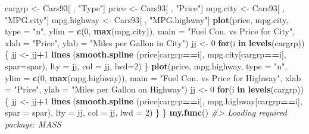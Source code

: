 \documentclass[
]{book}
\newenvironment{Shaded}{\begin{snugshade}}{\end{snugshade}}
\newcommand{\AttributeTok}[1]{\textcolor[rgb]{0.13,0.29,0.53}{#1}}
\newcommand{\CommentTok}[1]{\textcolor[rgb]{0.56,0.35,0.01}{\textit{#1}}}
\newcommand{\ControlFlowTok}[1]{\textcolor[rgb]{0.13,0.29,0.53}{\textbf{#1}}}
\newcommand{\DecValTok}[1]{\textcolor[rgb]{0.00,0.00,0.81}{#1}}
\newcommand{\FunctionTok}[1]{\textcolor[rgb]{0.13,0.29,0.53}{\textbf{#1}}}
\newcommand{\NormalTok}[1]{#1}
\newcommand{\OtherTok}[1]{\textcolor[rgb]{0.56,0.35,0.01}{#1}}
\newcommand{\SpecialCharTok}[1]{\textcolor[rgb]{0.81,0.36,0.00}{\textbf{#1}}}
\newcommand{\StringTok}[1]{\textcolor[rgb]{0.31,0.60,0.02}{#1}}
\begin{document}
\begin{Shaded}
\begin{Highlighting}[]
\NormalTok{  cargrp }\OtherTok{\textless{}{-}}\NormalTok{ Cars93[ , }\StringTok{"Type"}\NormalTok{]}
\NormalTok{  price }\OtherTok{\textless{}{-}}\NormalTok{ Cars93[ , }\StringTok{"Price"}\NormalTok{]}
\NormalTok{  mpg.city }\OtherTok{\textless{}{-}}\NormalTok{ Cars93[ , }\StringTok{"MPG.city"}\NormalTok{]}
\NormalTok{  mpg.highway }\OtherTok{\textless{}{-}}\NormalTok{ Cars93[ , }\StringTok{"MPG.highway"}\NormalTok{]}
  \FunctionTok{plot}\NormalTok{(price, mpg.city, }\AttributeTok{type =} \StringTok{"n"}\NormalTok{, }\AttributeTok{ylim =} \FunctionTok{c}\NormalTok{(}\DecValTok{0}\NormalTok{, }\FunctionTok{max}\NormalTok{(mpg.city)), }
       \AttributeTok{main =} \StringTok{"Fuel Con. vs Price for City"}\NormalTok{, }\AttributeTok{xlab =} \StringTok{"Price"}\NormalTok{, }
       \AttributeTok{ylab =} \StringTok{"Miles per Gallon in City"}\NormalTok{)}
\NormalTok{  jj }\OtherTok{\textless{}{-}} \DecValTok{0}
  \ControlFlowTok{for}\NormalTok{(i }\ControlFlowTok{in} \FunctionTok{levels}\NormalTok{(cargrp))}
\NormalTok{    \{  jj }\OtherTok{\textless{}{-}}\NormalTok{ jj}\SpecialCharTok{+}\DecValTok{1}
       \FunctionTok{lines}\NormalTok{ (}\FunctionTok{smooth.spline}\NormalTok{ (price[cargrp}\SpecialCharTok{==}\NormalTok{i], mpg.city[cargrp}\SpecialCharTok{==}\NormalTok{i], }\AttributeTok{spar=}\NormalTok{spar),}
              \AttributeTok{lty =}\NormalTok{ jj, }\AttributeTok{col =}\NormalTok{ jj, }\AttributeTok{lwd=}\DecValTok{2}\NormalTok{)}
\NormalTok{    \}}
  \FunctionTok{plot}\NormalTok{(price, mpg.highway, }\AttributeTok{type =} \StringTok{"n"}\NormalTok{, }\AttributeTok{ylim =} \FunctionTok{c}\NormalTok{(}\DecValTok{0}\NormalTok{, }\FunctionTok{max}\NormalTok{(mpg.highway)), }
       \AttributeTok{main =} \StringTok{"Fuel Con. vs Price for Highway"}\NormalTok{, }\AttributeTok{xlab =} \StringTok{"Price"}\NormalTok{, }
       \AttributeTok{ylab =} \StringTok{"Miles per Gallon on Highway"}\NormalTok{)}
\NormalTok{  jj }\OtherTok{\textless{}{-}} \DecValTok{0}
  \ControlFlowTok{for}\NormalTok{(i }\ControlFlowTok{in} \FunctionTok{levels}\NormalTok{(cargrp))}
\NormalTok{    \{  jj }\OtherTok{\textless{}{-}}\NormalTok{ jj}\SpecialCharTok{+}\DecValTok{1}
       \FunctionTok{lines}\NormalTok{ (}\FunctionTok{smooth.spline}\NormalTok{ (price[cargrp}\SpecialCharTok{==}\NormalTok{i], mpg.highway[cargrp}\SpecialCharTok{==}\NormalTok{i], }
                             \AttributeTok{spar =}\NormalTok{ spar),}
              \AttributeTok{lty =}\NormalTok{ jj, }\AttributeTok{col =}\NormalTok{ jj, }\AttributeTok{lwd =} \DecValTok{2}\NormalTok{)}
\NormalTok{    \}}
\NormalTok{\}}
\FunctionTok{my.func}\NormalTok{()}
\CommentTok{\#\textgreater{} Loading required package: MASS}
\end{Highlighting}
\end{Shaded}
\end{document}
